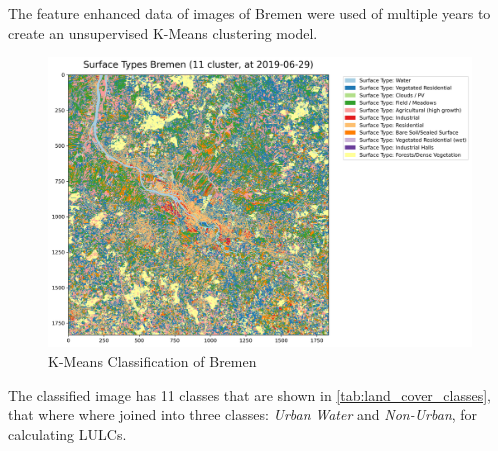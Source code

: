 \documentclass[12pt,a4paper, english,twoside]{article}
\begin{document}
      The feature enhanced data of images of Bremen%
      were used of multiple years to create an unsupervised K-Means clustering model.
      \begin{figure}
          \includegraphics[width=\textwidth]{img/Classification.png}
       \caption{K-Means Classification of Bremen\label{fig:classification}}
      \end{figure}
      The classified image has 11 classes that are shown in \cref{tab:land_cover_classes}, that where where joined into three classes: \textit{Urban} \textit{Water} and \textit{Non-Urban}, for calculating \glspl{LULC}. \\ 
\end{document}
